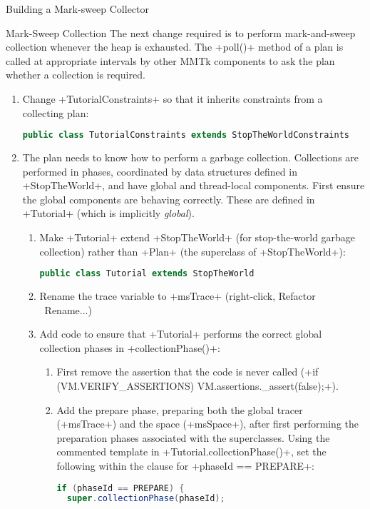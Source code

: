 \begin{chapter}{Building a Mark-sweep Collector}
\begin{section}{Mark-Sweep Collection}
The next change required is to perform mark-and-sweep collection whenever the heap is exhausted. The \spverb+poll()+ method of a plan is called at appropriate intervals by other MMTk components to ask the plan whether a collection is required.
\begin{enumerate}
  \item Change \spverb+TutorialConstraints+ so that it inherits constraints from a collecting plan:
    \begin{lstlisting}[language=Java]
public class TutorialConstraints extends StopTheWorldConstraints
    \end{lstlisting}
  \item The plan needs to know how to perform a garbage collection. Collections are performed in phases, coordinated by data structures defined in \spverb+StopTheWorld+, and have global and thread-local components. First ensure the global components are behaving correctly. These are defined in \spverb+Tutorial+ (which is implicitly \textit{global}).
    \begin{enumerate}
      \item Make \spverb+Tutorial+ extend \spverb+StopTheWorld+ (for stop-the-world garbage collection) rather than \spverb+Plan+ (the superclass of \spverb+StopTheWorld+):
        \begin{lstlisting}[language=Java]
public class Tutorial extends StopTheWorld
        \end{lstlisting}
       \item Rename the trace variable to \spverb+msTrace+ (right-click, Refactor \textrightarrow\ Rename...)
       \item Add code to ensure that \spverb+Tutorial+ performs the correct global collection phases in \spverb+collectionPhase()+:
         \begin{enumerate}
           \item First remove the assertion that the code is never called (\spverb+if (VM.VERIFY_ASSERTIONS) VM.assertions._assert(false);+).
           \item Add the prepare phase, preparing both the global tracer (\spverb+msTrace+) and the space (\spverb+msSpace+), after first performing the preparation phases associated with the superclasses. Using the commented template in \spverb+Tutorial.collectionPhase()+, set the following within the clause for \spverb+phaseId == PREPARE+:
             \begin{lstlisting}[language=Java]
if (phaseId == PREPARE) {
  super.collectionPhase(phaseId);

\end{lstlisting}
\end{enumerate}
\end{enumerate}
\end{enumerate}
\end{section}
\end{chapter}
